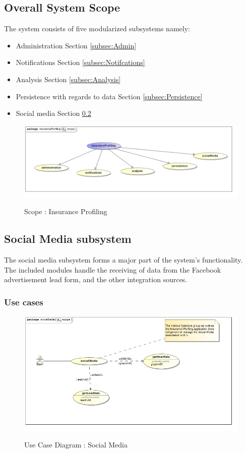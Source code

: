 \documentclass{article}
\begin{document}
	\subsection{Overall System Scope}
	The system consists of five modularized subsystems namely:
	\begin{itemize}
		\item Administration Section \ref{subsec:Admin}
		\item Notifications Section \ref{subsec:Notifcations}
		\item Analysis Section \ref{subsec:Analysis}
		\item Persistence with regards to data Section \ref{subsec:Persistence}
		\item Social media Section \ref{subsec:SocialMedia}
	\end{itemize}
		\begin{figure}[H]
		\includegraphics[width=\textwidth]{images/uc__insuranceProfiling__scope.jpg}  \\
		\caption{Scope : Insurance Profiling}
		\end{figure}
		
		
		\pagebreak
	\subsection{Social Media subsystem}\label{subsec:SocialMedia}
	The social media subsystem forms a major part of the system's functionality. \\The included modules handle the receiving of data from the Facebook advertisement lead form, and the other integration sources.
		\subsubsection{Use cases}
		\begin{figure}[H]
		\includegraphics[width=\textwidth]{images/uc__socialMedia__scope.jpg}  \\
		\caption{Use Case Diagram : Social Media}
		\end{figure}
\end{document}
